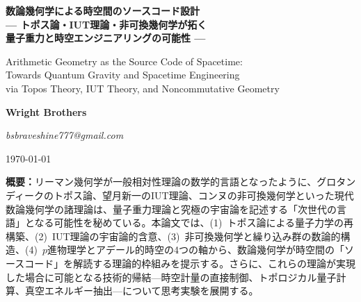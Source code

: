 \documentclass[12pt,a4paper]{ltjsarticle}
\theoremstyle{definition}
\begin{document}
\begin{titlepage}
\centering
\vspace*{2cm}

{\LARGE\sffamily\bfseries
数論幾何学による時空間のソースコード設計\\[14pt]
--- トポス論・IUT理論・非可換幾何学が拓く\\[8pt]
量子重力と時空エンジニアリングの可能性 ---
}

\vspace{1.5cm}

{\large\sffamily
Arithmetic Geometry as the Source Code of Spacetime:\\
Towards Quantum Gravity and Spacetime Engineering\\
via Topos Theory, IUT Theory, and Noncommutative Geometry
}

\vspace{2cm}

{\large\bfseries Wright Brothers}

\vspace{0.3cm}

{\normalsize\itshape bsbraveshine777@gmail.com}

\vspace{1.5cm}

{\large \today}

\vspace{2cm}

\begin{tcolorbox}[colback=deepblue!3, colframe=deepblue!40, width=13cm]
\sffamily\small
\textbf{概要：}リーマン幾何学が一般相対性理論の数学的言語となったように、グロタンディークのトポス論、望月新一のIUT理論、コンヌの非可換幾何学といった現代数論幾何学の諸理論は、量子重力理論と究極の宇宙論を記述する「次世代の言語」となる可能性を秘めている。本論文では、(1)~トポス論による量子力学の再構築、(2)~IUT理論の宇宙論的含意、(3)~非可換幾何学と繰り込み群の数論的構造、(4)~$p$進物理学とアデール的時空の4つの軸から、数論幾何学が時空間の「ソースコード」を解読する理論的枠組みを提示する。さらに、これらの理論が実現した場合に可能となる技術的帰結---時空計量の直接制御、トポロジカル量子計算、真空エネルギー抽出---について思考実験を展開する。
\end{tcolorbox}

\end{titlepage}

\tableofcontents
\newpage
\end{document}
